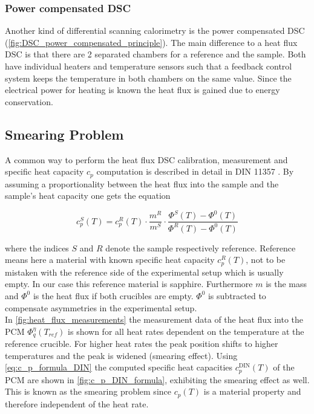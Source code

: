 \documentclass{scrartcl}[12pt, halfparskip]
\numberwithin{equation}{section}
\numberwithin{figure}{section}
\numberwithin{table}{section}
\begin{document}
\subsubsection{Power compensated DSC}
\label{sec:power_compensated_dsc}
Another kind of differential scanning calorimetry is the
power compensated DSC (\cref{fig:DSC_power_compensated_principle}). 
The main difference to a heat flux DSC is that there are 2 separated chambers for a reference and the sample. Both have individual heaters and temperature sensors such that a feedback control system keeps the temperature in both chambers on the same value. Since the electrical power for heating is known the heat flux is gained due to energy conservation. \\


\subsection{Smearing Problem}
\label{sec:smearing_problem}
A common way to perform the heat flux DSC calibration, measurement and specific heat capacity $c_p$ computation is described in detail in DIN 11357 \cite{DIN_11357}. By assuming a proportionality between the heat flux into the sample and the sample's heat capacity one gets the equation

\begin{equation}
	c_p^S(T) = c_p^{R}(T) \cdot \frac{m^R}{m^S} \cdot \frac{\varPhi^S(T) - \varPhi^0(T)}{\varPhi^R(T) - \varPhi^0(T)}
	\label{eq:c_p_formula_DIN}
\end{equation}

where the indices $S$ and $R$ denote the sample respectively reference. Reference means here a material with known specific heat capacity $c_p^R(T)$, not to be mistaken with the reference side of the experimental setup which is usually empty. In our case this reference material is sapphire. Furthermore $m$ is the mass and $\varPhi^0$ is the heat flux if both crucibles are empty. $\varPhi^0$ is subtracted to compensate asymmetries in the experimental setup. \\
In \cref{fig:heat_flux_measurements} the measurement data of the heat flux into the PCM $\varPhi_q^{\eta}(T_{ref})$ is shown for all heat rates dependent on the temperature at the reference crucible. For higher heat rates the peak position shifts to higher temperatures and the peak is widened (smearing effect). Using \cref{eq:c_p_formula_DIN} the computed specific heat capacities $c_p^{\text{DIN}}(T)$ of the PCM are shown in \cref{fig:c_p_DIN_formula}, exhibiting the smearing effect as well. This is known as the smearing problem since $c_p(T)$ is a material property and therefore independent of the heat rate.
\end{document}
